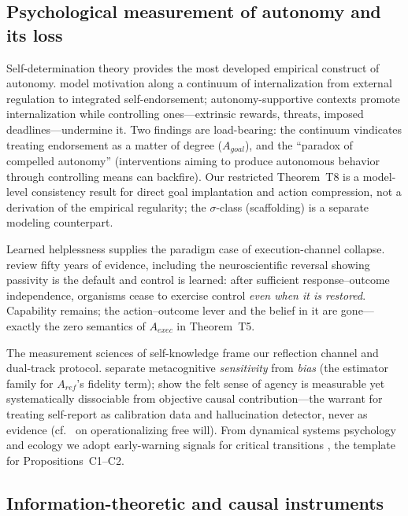 \subsection{Psychological measurement of autonomy and its loss}\label{rw:psych}

Self-determination theory provides the most developed empirical construct of
autonomy. \citet{ryan_deci2000} model motivation along a continuum of
internalization from external regulation to integrated self-endorsement;
autonomy-supportive contexts promote internalization while controlling
ones---extrinsic rewards, threats, imposed deadlines---undermine it. Two
findings are load-bearing: the continuum vindicates treating endorsement as a
matter of degree ($A_{goal}$), and the ``paradox of compelled autonomy''
(interventions aiming to produce autonomous behavior through controlling
means can backfire). Our restricted Theorem~T8 is a model-level consistency
result for direct goal implantation and action compression, not a derivation
of the empirical regularity; the $\sigma$-class (scaffolding) is a separate
modeling counterpart.

Learned helplessness supplies the paradigm case of execution-channel
collapse. \citet{maier_seligman2016} review fifty years of evidence, including
the neuroscientific reversal showing passivity is the default and control is
learned: after sufficient response--outcome independence, organisms cease to
exercise control \emph{even when it is restored}. Capability remains; the
action--outcome lever and the belief in it are gone---exactly the zero
semantics of $A_{exec}$ in Theorem~T5.

The measurement sciences of self-knowledge frame our reflection channel and
dual-track protocol. \citet{fleming_lau2014} separate metacognitive
\emph{sensitivity} from \emph{bias} (the estimator family for $A_{ref}$'s
fidelity term); \citet{moore_obhi2012} show the felt sense of agency is
measurable yet systematically dissociable from objective causal
contribution---the warrant for treating self-report as calibration data and
hallucination detector, never as evidence (cf.\ \citealp{lavazza2016} on
operationalizing free will). From dynamical systems psychology and ecology we
adopt early-warning signals for critical transitions \citep{lade_gross2012},
the template for Propositions~C1--C2.

\subsection{Information-theoretic and causal instruments}\label{rw:tools}

